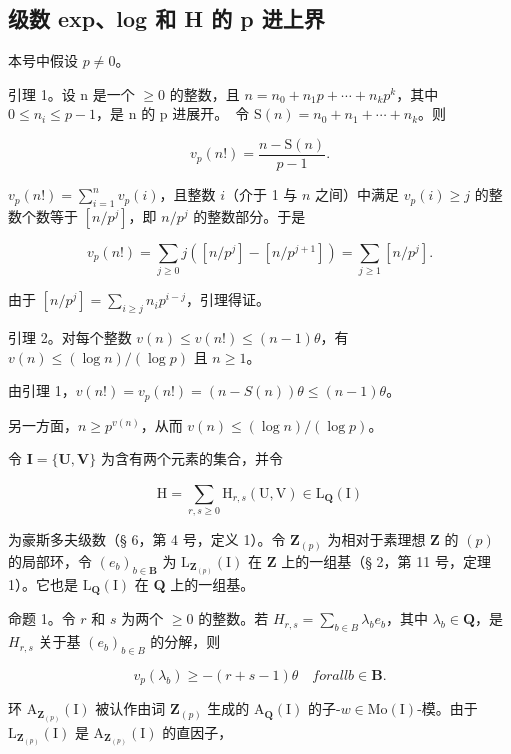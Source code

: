 \subsection{级数 exp、log 和 H 的 p 进上界}

本号中假设 \(p \neq 0\)。

引理 1。设 n 是一个 \(\geqslant0\) 的整数，且 \(n=n_{0}+n_{1}p+\cdots+n_{k}p^{k}\)，其中 \(0\leqslant n_{i}\leqslant p-1\)，是 n 的 p 进展开。~令 \(\mathrm{S}(n)=n_{0}+n_{1}+\cdots+n_{k}\)。则

\[
v _ {p} (n!) = \frac {n - \mathrm{S} (n)}{p - 1}.\tag{3}
\]

  \(v_{p}(n!) = \sum_{i=1}^{n} v_{p}(i)\)，且整数 \(i\)（介于 1 与 \(n\) 之间）中满足 \(v_{p}(i) \geqslant j\) 的整数个数等于 \([n/p^{j}]\)，即 \(n/p^{j}\) 的整数部分。于是

\[
v _ {p} (n!) = \sum_ {j \geqslant 0} j ([ n / p ^ {j} ] - [ n / p ^ {j + 1} ]) = \sum_ {j \geqslant 1} [ n / p ^ {j} ].
\]

由于 \([n / p^j] = \sum_{i\geqslant j}n_i p^{i - j}\)，引理得证。

引理 2。对每个整数 \(v(n) \leqslant v(n!) \leqslant (n - 1)\theta\)，有 \(v(n) \leqslant (\log n) / (\log p)\) 且 \(n \geqslant 1\)。

由引理 1，\(v(n!) = v_{p}(n!) = (n - S(n))\theta \leqslant (n - 1)\theta\)。

另一方面，\(n \geqslant p^{v(n)}\)，从而 \(v(n) \leqslant (\log n) / (\log p)\)。

令 \(\mathbf{I} = \{\mathbf{U},\mathbf{V}\}\) 为含有两个元素的集合，并令

\[
\mathrm{H} = \sum_ {r, s \geqslant 0} \mathrm{H} _ {r, s} (\mathrm{U}, \mathrm{V}) \in \hat {\mathrm{L}} _ {\mathbf {Q}} (\mathrm{I})
\]

为豪斯多夫级数（§ 6，第 4 号，定义 1）。令 \(\mathbf{Z}_{(p)}\) 为相对于素理想 \(\mathbf{Z}\) 的 \((p)\) 的局部环，令 \((e_b)_{b \in \mathbf{B}}\) 为 \(\mathrm{L}_{\mathbf{Z}_{(p)}}(\mathrm{I})\) 在 \(\mathbf{Z}\) 上的一组基（§ 2，第 11 号，定理 1）。它也是 \(\mathrm{L}_{\mathbf{Q}}(\mathrm{I})\) 在 \(\mathbf{Q}\) 上的一组基。

命题 1。令 \(r\) 和 \(s\) 为两个 \(\geqslant 0\) 的整数。若 \(H_{r,s} = \sum_{b \in B} \lambda_b e_b\)，其中 \(\lambda_b \in \mathbf{Q}\)，是 \(H_{r,s}\) 关于基 \((e_b)_{b \in B}\) 的分解，则

\[
v _ {p} (\lambda_ {b}) \geqslant - (r + s - 1) \theta \quad for all b \in \mathbf {B}.\tag{4}
\]

环 \(\mathrm{A}_{\mathbf{Z}_{(p)}}(\mathrm{I})\) 被认作由词 \(\mathbf{Z}_{(p)}\) 生成的 \(\mathrm{A}_{\mathbf{Q}}(\mathrm{I})\) 的子-\(w \in \mathrm{Mo}(\mathrm{I})\)-模。由于 \(\mathrm{L}_{\mathbf{Z}_{(p)}}(\mathrm{I})\) 是 \(\mathrm{A}_{\mathbf{Z}_{(p)}}(\mathrm{I})\) 的直因子，

